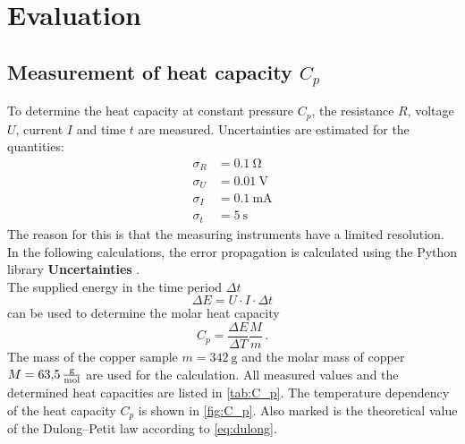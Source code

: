 \section{Evaluation}
\label{sec:evaluation}

\subsection{Measurement of heat capacity $C_p$}
To determine the heat capacity at constant pressure $C_p$, the resistance $R$, voltage $U$, current $I$ and time $t$ are measured.
Uncertainties are estimated for the quantities:
\begin{align*}
    \sigma_R &= \qty{0.1}{\ohm} \\
    \sigma_U &= \qty{0.01}{\volt}\\
    \sigma_I &= \qty{0.1}{\milli\ampere} \\
    \sigma_t &= \qty{5}{\second}
\end{align*}
The reason for this is that the measuring instruments have a limited resolution.
In the following calculations, the error propagation is calculated using the Python library \textbf{Uncertainties} \cite{uncertainties}.
\\
The supplied energy in the time period $\Delta t$
\begin{equation}
    \Delta E = U \cdot I \cdot \Delta t
\end{equation}
can be used to determine the molar heat capacity
\begin{equation}
    C_p = \frac{\Delta E}{\Delta T} \frac{M}{m} \,.
\end{equation}
The mass of the copper sample $m = \qty{342}{\gram}$ \cite{V47} and the molar mass of copper $M = \qty{63.5}{\frac{\gram}{\mol}}$ \cite{goodfellow} are used for the calculation.
All measured values and the determined heat capacities are listed in \autoref{tab:C_p}.
The temperature dependency of the heat capacity $C_p$ is shown in \autoref{fig:C_p}.
Also marked is the theoretical value of the Dulong–Petit law according to \autoref{eq:dulong}.
